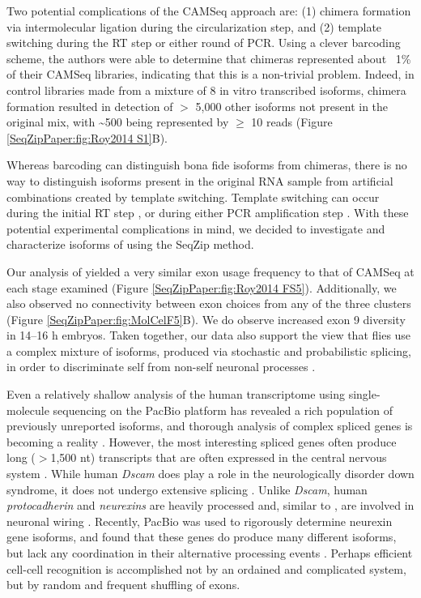 		Two potential complications of the CAMSeq approach are: (1) chimera formation via intermolecular ligation during the circularization step, and (2) template switching during the RT step or either round of PCR. Using a clever barcoding scheme, the authors were able to determine that chimeras represented about ~1\% of their CAMSeq libraries, indicating that this is a non-trivial problem. Indeed, in control libraries made from a mixture of 8 in vitro transcribed \dscam{} isoforms, chimera formation resulted in detection of $>$ 5,000 other isoforms not present in the original mix, with \textasciitilde 500 being represented by $\ge$ 10 reads (Figure \ref{SeqZipPaper:fig:Roy2014 S1}B).

		Whereas barcoding can distinguish bona fide isoforms from chimeras, there is no way to distinguish isoforms present in the original RNA sample from artificial combinations created by template switching. Template switching can occur during the initial RT step \citep{Houseley2010a}, or during either PCR amplification step \citep{Meyerhans1990a,Judo1998}. With these potential experimental complications in mind, we decided to investigate and characterize isoforms of \dscam{} using the SeqZip method.

		Our analysis of \dscam{} yielded a very similar exon usage frequency to that of CAMSeq at each stage examined (Figure \ref{SeqZipPaper:fig:Roy2014 FS5}). Additionally, we also observed no connectivity between exon choices from any of the three clusters (Figure \ref{SeqZipPaper:fig:MolCelF5}B). We do observe increased exon 9 diversity in 14–16 h embryos. Taken together, our data also support the view that flies use a complex mixture of \dscam{} isoforms, produced via stochastic and probabilistic splicing, in order to discriminate self from non-self neuronal processes \citep{LawrenceZipursky2013}.

		Even a relatively shallow analysis of the human transcriptome using single-molecule sequencing on the PacBio platform has revealed a rich population of previously unreported isoforms, and thorough analysis of complex spliced genes is becoming a reality \citep{Sharon2013}. However, the most interesting spliced genes often produce long ($>$1,500 nt) transcripts that are often expressed in the central nervous system \citep{Park2007}. While human \textit{Dscam} does play a role in the neurologically disorder down syndrome, it does not undergo extensive splicing \citep{Yamakawa1998a}. Unlike \textit{Dscam}, human \textit{protocadherin} and \textit{neurexins} are heavily processed and, similar to \dscam{}, are involved in neuronal wiring \citep{Ushkaryov1992,Wu1999}. Recently, PacBio was used to rigorously determine neurexin gene isoforms, and found that these genes do produce many different isoforms, but lack any coordination in their alternative processing events \citep{Treutlein2014}. Perhaps efficient cell-cell recognition is accomplished not by an ordained and complicated system, but by random and frequent shuffling of exons.

